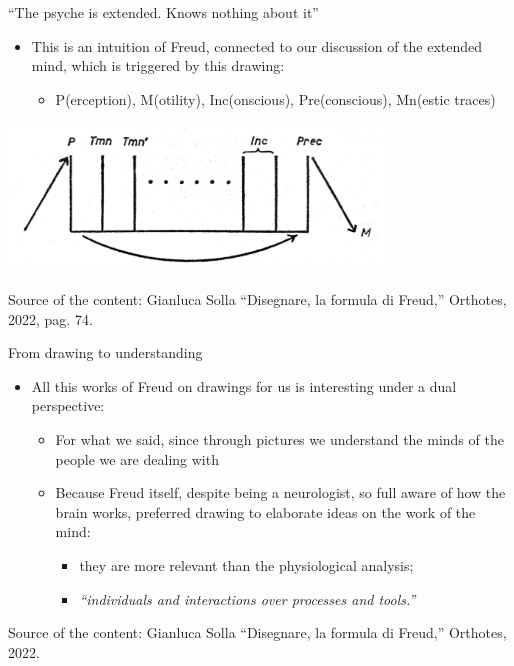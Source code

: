 \documentclass{beamer}
\begin{document}
\begin{frame}
{\centerline{``The psyche is extended. Knows nothing about it''}}
\begin{itemize}
\item This is an intuition of Freud, connected to our discussion of the extended mind, which is triggered by this drawing:
\begin{itemize}
\item P(erception), M(otility), Inc(onscious), Pre(conscious), Mn(estic traces)
 \end{itemize}
  \end{itemize} 

\begin{center}
 \includegraphics[width=10cm]{P2023.AIBCCSS.Drawing/perceptionMotility.jpg}
 
 \end{center}


\begin{center}
\tiny
Source of the content: Gianluca Solla ``Disegnare, la formula di Freud,'' Orthotes, 2022, pag. 74.
\end{center}
\end{frame}


\begin{frame}
{\centerline{From drawing to understanding}}
\begin{itemize}
\item All this works of Freud on drawings for us is interesting under a dual perspective:
\begin{itemize}
\item For what we said, since through pictures we understand the minds of the people we are dealing with
\item Because Freud itself, despite being a neurologist, so full aware of how the brain works, preferred drawing to elaborate ideas on the work of the mind:
\begin{itemize}
\item they are more relevant than the physiological analysis;
\item \textit{``individuals and interactions over processes and tools.''}
 \end{itemize} 
 \end{itemize} 
 \end{itemize} 

\begin{center}
\tiny
Source of the content: Gianluca Solla ``Disegnare, la formula di Freud,'' Orthotes, 2022.
\end{center}
\end{frame}
\end{document}
